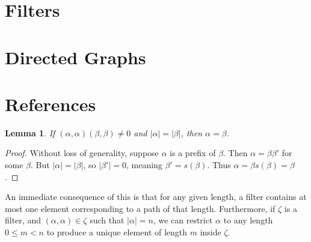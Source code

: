 \documentclass{article}
\newtheorem{lemma}[theorem]{Lemma}
\theoremstyle{definition}
\begin{document}
\section{Filters}
\section{Directed Graphs}
\section{References}

\begin{lemma} If $(\alpha, \alpha)(\beta, \beta) \neq 0$ and $|\alpha| = |\beta|$, then $\alpha = \beta$. \end{lemma}
\begin{proof}
    Without loss of generality, suppose $\alpha$ is a prefix of $\beta$. Then $\alpha = \beta \beta'$ for some $\beta$. But
    $|\alpha| = |\beta|$, so $|\beta'| = 0$, meaning $\beta' = s(\beta)$. Thus $\alpha = \beta s(\beta) = \beta$.
\end{proof}
An immediate consequence of this is that for any given length, a filter contains at most one element corresponding
to a path of that length. Furthermore, if $\zeta$ is a filter, and $(\alpha, \alpha) \in \zeta$ such that $|\alpha| = n$,
we can restrict $\alpha$ to any length $0 \leq m < n$ to produce a unique element of length $m$ inside $\zeta$.
\end{document}

